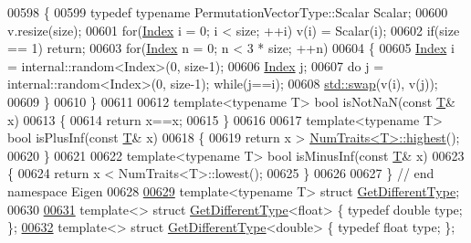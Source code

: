 \begin{DoxyCode}
00598 \{
00599   \textcolor{keyword}{typedef} \textcolor{keyword}{typename} PermutationVectorType::Scalar Scalar;
00600   v.resize(size);
00601   \textcolor{keywordflow}{for}(\hyperlink{namespace_eigen_a62e77e0933482dafde8fe197d9a2cfde}{Index} i = 0; i < size; ++i) v(i) = Scalar(i);
00602   \textcolor{keywordflow}{if}(size == 1) \textcolor{keywordflow}{return};
00603   \textcolor{keywordflow}{for}(\hyperlink{namespace_eigen_a62e77e0933482dafde8fe197d9a2cfde}{Index} n = 0; n < 3 * size; ++n)
00604   \{
00605     \hyperlink{namespace_eigen_a62e77e0933482dafde8fe197d9a2cfde}{Index} i = internal::random<Index>(0, size-1);
00606     \hyperlink{namespace_eigen_a62e77e0933482dafde8fe197d9a2cfde}{Index} j;
00607     \textcolor{keywordflow}{do} j = internal::random<Index>(0, size-1); \textcolor{keywordflow}{while}(j==i);
00608     \hyperlink{endian_8c_a3ca5ecd34b04d6a243c054ac3a57f68d}{std::swap}(v(i), v(j));
00609   \}
00610 \}
00611 
00612 \textcolor{keyword}{template}<\textcolor{keyword}{typename} T> \textcolor{keywordtype}{bool} isNotNaN(\textcolor{keyword}{const} \hyperlink{group___sparse_core___module}{T}& x)
00613 \{
00614   \textcolor{keywordflow}{return} x==x;
00615 \}
00616 
00617 \textcolor{keyword}{template}<\textcolor{keyword}{typename} T> \textcolor{keywordtype}{bool} isPlusInf(\textcolor{keyword}{const} \hyperlink{group___sparse_core___module}{T}& x)
00618 \{
00619   \textcolor{keywordflow}{return} x > \hyperlink{group___core___module_struct_eigen_1_1_num_traits}{NumTraits<T>::highest}();
00620 \}
00621 
00622 \textcolor{keyword}{template}<\textcolor{keyword}{typename} T> \textcolor{keywordtype}{bool} isMinusInf(\textcolor{keyword}{const} \hyperlink{group___sparse_core___module}{T}& x)
00623 \{
00624   \textcolor{keywordflow}{return} x < NumTraits<T>::lowest();
00625 \}
00626 
00627 \} \textcolor{comment}{// end namespace Eigen}
00628 
\hyperlink{struct_get_different_type}{00629} \textcolor{keyword}{template}<\textcolor{keyword}{typename} T> \textcolor{keyword}{struct }\hyperlink{struct_get_different_type}{GetDifferentType};
00630 
\hyperlink{struct_get_different_type_3_01float_01_4}{00631} \textcolor{keyword}{template}<> \textcolor{keyword}{struct }\hyperlink{struct_get_different_type}{GetDifferentType}<float> \{ \textcolor{keyword}{typedef} \textcolor{keywordtype}{double} type; \};
\hyperlink{struct_get_different_type_3_01double_01_4}{00632} \textcolor{keyword}{template}<> \textcolor{keyword}{struct }\hyperlink{struct_get_different_type}{GetDifferentType}<double> \{ \textcolor{keyword}{typedef} \textcolor{keywordtype}{float} type; \};

\end{DoxyCode}
